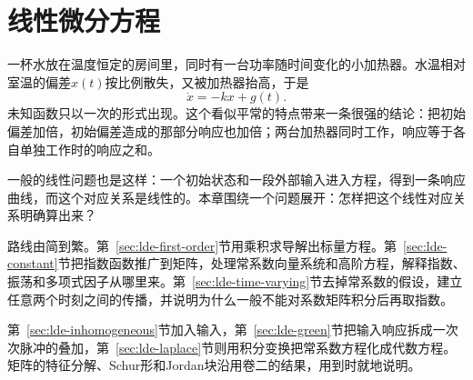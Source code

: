 \chapter{线性微分方程}
\label{chap:linear-differential-systems}

一杯水放在温度恒定的房间里，同时有一台功率随时间变化的小加热器。水温相对室温的偏差$x(t)$按比例散失，又被加热器抬高，于是
\[
 \dot{x}=-kx+g(t).
\]
未知函数只以一次的形式出现。这个看似平常的特点带来一条很强的结论：把初始偏差加倍，初始偏差造成的那部分响应也加倍；两台加热器同时工作，响应等于各自单独工作时的响应之和。

一般的线性问题也是这样：一个初始状态和一段外部输入进入方程，得到一条响应曲线，而这个对应关系是线性的。本章围绕一个问题展开：怎样把这个线性对应关系明确算出来？

路线由简到繁。第~\ref{sec:lde-first-order}节用乘积求导解出标量方程。第~\ref{sec:lde-constant}节把指数函数推广到矩阵，处理常系数向量系统和高阶方程，解释指数、振荡和多项式因子从哪里来。第~\ref{sec:lde-time-varying}节去掉常系数的假设，建立任意两个时刻之间的传播，并说明为什么一般不能对系数矩阵积分后再取指数。

第~\ref{sec:lde-inhomogeneous}节加入输入，第~\ref{sec:lde-green}节把输入响应拆成一次次脉冲的叠加，第~\ref{sec:lde-laplace}节则用积分变换把常系数方程化成代数方程。矩阵的特征分解、Schur形和Jordan块沿用卷二的结果，用到时就地说明。














